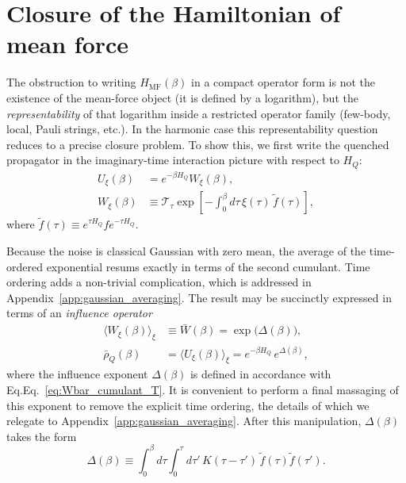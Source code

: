﻿%
\section{Closure of the Hamiltonian of mean force \label{sec:closure}}
The obstruction to writing $H_{\mathrm{MF}}(\beta)$ in a compact operator form is not the
existence of the mean-force object (it is defined by a logarithm), but the \emph{representability} of that logarithm inside a restricted operator family (few-body, local, Pauli strings, etc.). In the harmonic case this representability question reduces to a precise closure problem. To show this, we first write the quenched propagator in the imaginary-time interaction picture with respect to $H_Q$:
\begin{equation}
    \begin{split}
        U_\xi(\beta) & = e^{-\beta H_Q} W_\xi(\beta),                                                             \\
        W_\xi(\beta) & \equiv \mathcal T_\tau \exp\!\left[-\int_0^\beta d\tau\, \xi(\tau)\,\tilde f(\tau)\right],
    \end{split}
    \label{eq:Wxi_def}
\end{equation}
where $\tilde f(\tau)\equiv e^{\tau H_Q} f e^{-\tau H_Q}$.

Because the noise is classical Gaussian with zero mean, the average of the
time-ordered exponential resums exactly in terms of the second cumulant. Time ordering adds a non-trivial complication, which is addressed in Appendix~\ref{app:gaussian_averaging}. The result may be succinctly expressed in terms of an \emph{influence operator}
\begin{equation}
    \begin{split}
          \langle W_\xi(\beta)\rangle_\xi &\equiv \bar W(\beta) = \exp\!\big(\Delta(\beta)\big), \\
        \bar\rho_Q(\beta) &= \langle U_\xi(\beta)\rangle_\xi = e^{-\beta H_Q}\,e^{\Delta(\beta)},
    \end{split}
    \label{eq:rho_bar_product_form}
\end{equation}
where the influence exponent $\Delta(\beta)$ is defined in accordance with Eq.Eq.~\eqref{eq:Wbar_cumulant_T}. 
It is convenient to perform a final massaging of this exponent to remove the explicit time ordering, the details of which we relegate to Appendix~\ref{app:gaussian_averaging}. After this manipulation, $\Delta(\beta)$ takes the form
\begin{equation}
\Delta(\beta)\equiv \int_0^\beta d\tau\int_0^\tau d\tau'\,
K(\tau-\tau')\,\tilde f(\tau)\tilde f(\tau').
\label{eq:Delta_def_hermitian}
\end{equation}

